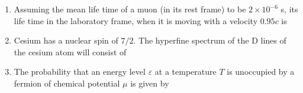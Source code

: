 \documentclass[14pt, a4paper]{extarticle}
\begin{document}
\begin{enumerate}[label=\textbf{Q. \arabic*}, start=21]
\item Assuming the mean life time of a muon (in its rest frame) to be $2\times10^{-6}$ s, its life time in the laboratory frame, when it is moving with a velocity $0.95c$ is
    \begin{enumerate}[label=(\Alph*)]
    \end{enumerate}


\item Cesium has a nuclear spin of $7/2$. The hyperfine spectrum of the D lines of the cesium atom will consist of
\begin{enumerate}[label=(\Alph*)]
\end{enumerate}

\item The probability that an energy level $\varepsilon$ at a temperature $T$ is unoccupied by a fermion of chemical potential $\mu$ is given by
\begin{enumerate}[label=(\Alph*)]
\end{enumerate}


\end{enumerate}
\end{document}
